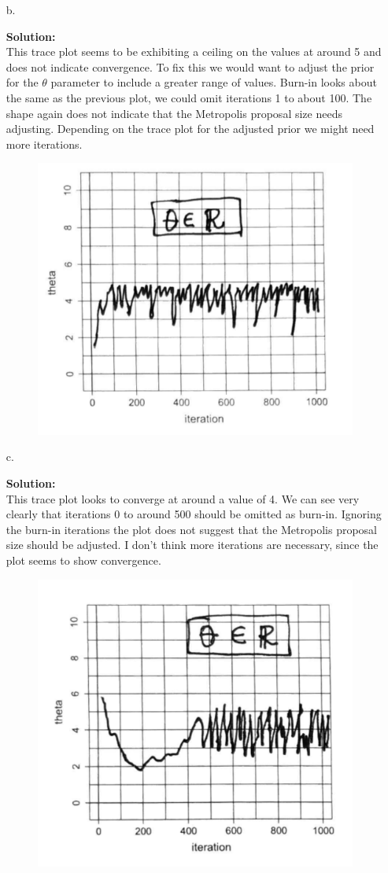 \documentclass[12pt]{article}
\makeatletter
\theoremstyle{homework}
\newenvironment{exercise}[1]
{\def\@currentlabel{#1}\exercisecore}
{\endexercisecore}
\newcommand{\localhead}[1]{\par\smallskip\noindent\textbf{#1}\nobreak\\}%
\newcommand\solution{\localhead{Solution:}}
\makeatother
\begin{document}
\begin{exercise}{3}
\begin{enumerate}
    \item[b.]
    \solution This trace plot seems to be exhibiting a ceiling on the values at around 5 and does not indicate convergence. To fix this we would want to adjust the prior for the 
    $\theta$ parameter to include a greater range of values. Burn-in looks about the same as the previous plot, we could omit iterations 1 to about 100. 
    The shape again does not indicate that the Metropolis proposal size needs adjusting. Depending on the trace plot for the adjusted prior we might need more iterations. 
    \begin{figure}[H]
      \begin{center}
      \includegraphics[width = .6\textwidth]{2traceplot.png}
      \end{center}
    \end{figure}
    \item[c.] 
    \solution This trace plot looks to converge at around a value of 4. We can see very clearly that iterations 0 to around 500 should be omitted as burn-in. 
    Ignoring the burn-in iterations the plot does not suggest that the Metropolis proposal size should be adjusted. I don't think more iterations are necessary, since the plot seems to show convergence.
    \begin{figure}[H]
      \begin{center}
      \includegraphics[width = .6\textwidth]{Traceplot3.png}
      \end{center}
    \end{figure} 


\end{enumerate}
\end{exercise}
\end{document}
